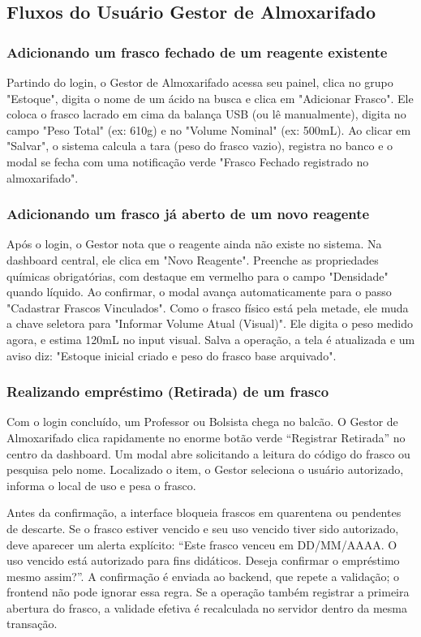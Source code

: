 \documentclass[12pt,a4paper]{article}
\begin{document}
\subsection{Fluxos do Usuário Gestor de Almoxarifado}

\subsubsection{Adicionando um frasco fechado de um reagente existente}
Partindo do login, o Gestor de Almoxarifado acessa seu painel, clica no grupo "Estoque", digita o nome de um ácido na busca e clica em "Adicionar Frasco". Ele coloca o frasco lacrado em cima da balança USB (ou lê manualmente), digita no campo "Peso Total" (ex: 610g) e no "Volume Nominal" (ex: 500mL). Ao clicar em "Salvar", o sistema calcula a tara (peso do frasco vazio), registra no banco e o modal se fecha com uma notificação verde "Frasco Fechado registrado no almoxarifado".

\subsubsection{Adicionando um frasco já aberto de um novo reagente}
Após o login, o Gestor nota que o reagente ainda não existe no sistema. Na dashboard central, ele clica em "Novo Reagente". Preenche as propriedades químicas obrigatórias, com destaque em vermelho para o campo "Densidade" quando líquido. Ao confirmar, o modal avança automaticamente para o passo "Cadastrar Frascos Vinculados". Como o frasco físico está pela metade, ele muda a chave seletora para "Informar Volume Atual (Visual)". Ele digita o peso medido agora, e estima 120mL no input visual. Salva a operação, a tela é atualizada e um aviso diz: "Estoque inicial criado e peso do frasco base arquivado".

\subsubsection{Realizando empréstimo (Retirada) de um frasco}
Com o login concluído, um Professor ou Bolsista chega no balcão. O Gestor de Almoxarifado clica rapidamente no enorme botão verde ``Registrar Retirada'' no centro da dashboard. Um modal abre solicitando a leitura do código do frasco ou pesquisa pelo nome. Localizado o item, o Gestor seleciona o usuário autorizado, informa o local de uso e pesa o frasco.

Antes da confirmação, a interface bloqueia frascos em quarentena ou pendentes de descarte. Se o frasco estiver vencido e seu uso vencido tiver sido autorizado, deve aparecer um alerta explícito: ``Este frasco venceu em DD/MM/AAAA. O uso vencido está autorizado para fins didáticos. Deseja confirmar o empréstimo mesmo assim?''. A confirmação é enviada ao backend, que repete a validação; o frontend não pode ignorar essa regra. Se a operação também registrar a primeira abertura do frasco, a validade efetiva é recalculada no servidor dentro da mesma transação.
\end{document}
